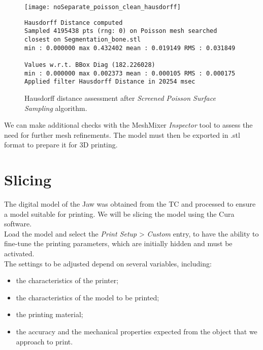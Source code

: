 \begin{figure}[h]
\centering
\texttt{[image: noSeparate\_poisson\_clean\_hausdorff]}
\caption[LoF entry]{Hausdorff distance assessment after \emph{Screened Poisson Surface Sampling} algorithm.}

\begin{lstlisting}
Hausdorff Distance computed
Sampled 4195438 pts (rng: 0) on Poisson mesh searched 
closest on Segmentation_bone.stl
min : 0.000000 max 0.432402 mean : 0.019149 RMS : 0.031849

Values w.r.t. BBox Diag (182.226028)
min : 0.000000 max 0.002373 mean : 0.000105 RMS : 0.000175 
Applied filter Hausdorff Distance in 20254 msec
\end{lstlisting}
\label{fig:noSeparate_poisson_clean_hausdorff}
\end{figure}

We can make additional checks with the MeshMixer \emph{Inspector} tool to assess the need for further mesh refinements.
The model must then be exported in .stl format to prepare it for 3D printing.

\section{Slicing}
The digital model of the Jaw was obtained from the TC and processed to ensure a model suitable for printing. We will be slicing the model using the Cura software.\\
Load the model and select the \emph{Print Setup} > \emph{Custom} entry, to have the ability to fine-tune the printing parameters, which are initially hidden and must be activated. \\
The settings to be adjusted depend on several variables, including:

\begin{itemize}
\item the characteristics of the printer;
\item the characteristics of the model to be printed;
\item the printing material;
\item the accuracy and the mechanical properties expected from the object that we approach to print.
\end{itemize}


